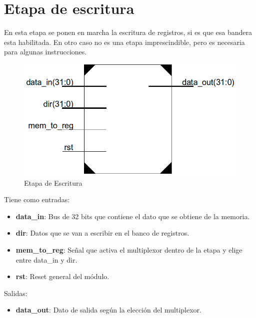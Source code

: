 \section {Etapa de escritura}

En esta etapa se ponen en marcha la escritura de registros, si es que esa bandera esta habilitada. En otro caso no es una etapa imprescindible, pero es necesaria para algunas instrucciones.

\begin{figure}[H]
\centering
\includegraphics[scale=0.5]{img/wb_stage}
\caption{Etapa de Escritura}
\label{fig:wb_stage}
\end{figure}

Tiene como entradas:
\begin{itemize}
  \item \textbf{data\_in}: Bus de 32 bits que contiene el dato que se obtiene de la memoria.
  \item \textbf{dir}: Datos que se van a escribir en el banco de registros.
  \item \textbf{mem\_to\_reg}: Señal que activa el multiplexor dentro de la etapa y elige entre data\_in y dir.
  \item \textbf{rst}: Reset general del m\'odulo.
\end{itemize}

Salidas:
\begin{itemize}
  \item \textbf{data\_out}: Dato de salida seg\'un la elecci\'on del multiplexor.
\end{itemize}